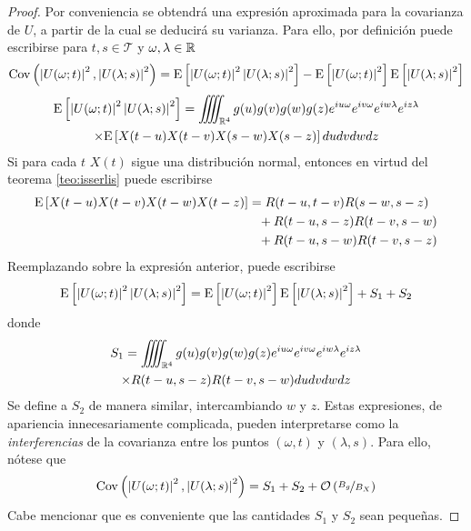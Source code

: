 
\begin{proof}
Por conveniencia se obtendrá una expresión aproximada para la covarianza de $U$, a partir de la cual se deducirá su varianza. 
%
Para ello, por definición puede escribirse para $t,s \in \mathcal{T}$ y $\omega, \lambda \in \mathbb{R}$
\begin{align*}
\mathrm{Cov}\left( \left| U(\omega;t) \right|^{2},\left| U(\lambda;s) \right|^{2} \right) =
\mathrm{E}\left[ \left| U(\omega;t) \right|^{2} \left| U(\lambda;s) \right|^{2} \right] - 
\mathrm{E}\left[ \left| U(\omega;t) \right|^{2} \right] \mathrm{E}\left[ \left| U(\lambda;s) \right|^{2} \right]
\end{align*}
\begin{multline}
\mathrm{E}\left[ \left| U(\omega;t) \right|^{2} \left| U(\lambda;s) \right|^{2} \right]
=
\iiiint_{\mathbb{R}^{4}} g(u) g(v) g(w) g(z) e^{i u \omega} e^{i v \omega} e^{i w \lambda} e^{i z \lambda} \\
 \times
\mathrm{E}\left[ {X(t-u)} {X(t-v)} {X(s-w)} {X(s-z)} \right]
du dv dw dz 
\end{multline}
Si para cada $t$ $X(t)$ sigue una distribución normal, entonces en virtud del teorema \ref{teo:isserlis} puede escribirse
\begin{align*}
\E{X(t-u) {X(t-v)} {X(t-w)} X(t-z)} 
&=       R(t-u,t-v)R(s-w,s-z) \\
&\pheq + R(t-u,s-z)R(t-v,s-w) \\
&\pheq + R(t-u,s-w)R(t-v,s-z)
\end{align*}
Reemplazando sobre la expresión anterior, puede escribirse
\begin{equation}
\mathrm{E}\left[ \left| U(\omega;t) \right|^{2} \left| U(\lambda;s) \right|^{2} \right] = \mathrm{E}\left[ \left| U(\omega;t) \right|^{2} \right] \mathrm{E}\left[ \left| U(\lambda;s) \right|^{2} \right]+ S_1 + S_2
\end{equation}
donde
\begin{multline*}
S_1 = \iiiint_{\mathbb{R}^{4}} g(u) g(v) g(w) g(z) e^{i u \omega} e^{i v \omega} e^{i w \lambda} e^{i z \lambda} \\
\times
R(t-u,s-z)R(t-v,s-w)
du dv dw dz 
\end{multline*}
Se define a $S_2$ de manera similar, intercambiando $w$ y $z$. 
%
Estas expresiones, de apariencia innecesariamente complicada, pueden interpretarse como la \textit{interferencias} de la covarianza entre los puntos $(\omega, t)$ y $(\lambda,s)$.
%
Para ello, nótese que
\begin{equation}
\mathrm{Cov}\left( \left| U(\omega;t) \right|^{2},\left| U(\lambda;s) \right|^{2} \right) = S_1 + S_2 + \mathcal{O}\left( \nicefrac{B_g}{B_X} \right)
\end{equation}
%
Cabe mencionar que es conveniente que las cantidades $S_1$ y $S_2$ sean pequeñas.


\end{proof}
